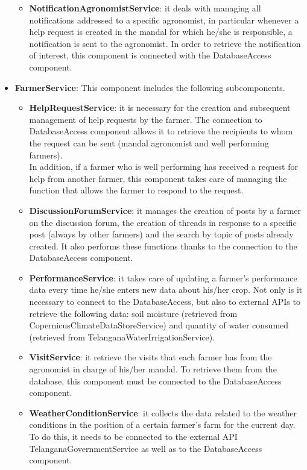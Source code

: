 \begin{itemize}
\begin{itemize}
    \item \textbf{NotificationAgronomistService}: it deals with managing all notifications addressed to a specific agronomist, in particular whenever a help request is created in the mandal for which he/she is responsible, a notification is sent to the agronomist. In order to retrieve the notification of interest, this component is connected with the DatabaseAccess component.
\end{itemize}

\item \textbf{FarmerService}: This component includes the following subcomponents.

\begin{itemize}
    \item \textbf{HelpRequestService}: it is necessary for the creation and subsequent management of help requests by the farmer. The connection to DatabaseAccess component allows it to retrieve the recipients to whom the request can be sent (mandal agronomist and well performing farmers).\\
    In addition, if a farmer who is well performing has received a request for help from another farmer, this component takes care of managing the function that allows the farmer to respond to the request.
    \item \textbf{DiscussionForumService}: it manages the creation of posts by a farmer on the discussion forum, the creation of threads in response to a specific post (always by other farmers) and the search by topic of posts already created. It also performs these functions thanks to the connection to the DatabaseAccess component.
    \item \textbf{PerformanceService}: it takes care of updating a farmer's performance data every time he/she  enters new data about his/her crop. Not only is it necessary to connect to the DatabaseAccess, but also to external APIs to retrieve the following data: soil moisture (retrieved from CopernicusClimateDataStoreService) and quantity of water consumed (retrieved from TelanganaWaterIrrigationService).
    \item \textbf{VisitService}: it retrieve the visits that each farmer has from the agronomist in charge of his/her mandal. To retrieve them from the database, this component must be connected to the DatabaseAccess component.
    \item \textbf{WeatherConditionService}: it collects the data related to the weather conditions in the position of a certain farmer's farm for the current day. To do this, it needs to be connected to the external API TelanganaGovernmentService as well as to the DatabaseAccess component.

\end{itemize}
\end{itemize}
